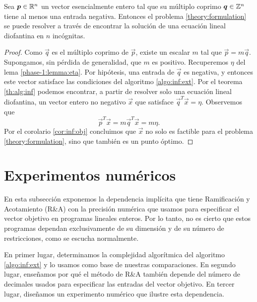 \begin{theorem}
	\label{infinite:th:complexity}
	Sea $\boldsymbol{p} \in \mathbb{R}^n$ un vector esencialmente entero tal que su múltiplo coprimo $\boldsymbol{q} \in
	\mathbb{Z}^n$ tiene al menos una entrada negativa. Entonces el problema \eqref{theory:formulation} se
	puede resolver a través de encontrar la solución de una ecuación lineal diofantina en $n$
	incógnitas.
\end{theorem}
\begin{proof}
	Como $\vec{q}$ es el múltiplo coprimo de $\vec{p}$, existe un escalar $m$ tal que
	$\vec{p} = m\vec{q}$. Supongamos, sin pérdida de generalidad, que $m$ es positivo. Recuperemos
	$\eta$ del lema \ref{phase-1:lemma:eta}. Por hipótesis, una entrada de $\vec{q}$ es negativa, y
	entonces este vector satisface las condiciones del algoritmo \ref{algo:inf:ext}. Por el teorema
	\ref{th:alg:inf} podemos encontrar, a partir de resolver solo una ecuación lineal diofantina, un
	vector entero no negativo $\vec{x}$ que satisface $\vec{q}^T\vec{x} = \eta$. Observemos que
	\begin{equation*}
		\vec{p}^T\vec{x} = m\vec{q}^T\vec{x} = m\eta.
	\end{equation*}
	Por el corolario \ref{cor:inf:obj} concluimos que $\vec{x}$ no solo es factible para el problema
	\eqref{theory:formulation}, sino que también es un punto óptimo.
\end{proof}

\section{Experimentos numéricos}
\label{sec:inf:exp}
\noindent
En esta subsección exponemos la dependencia implícita que tiene Ramificación y Acotamiento (R\&A)
con la precisión numérica que usamos para especificar el vector objetivo en programas lineales
enteros. Por lo tanto, no es cierto que estos programas dependan exclusivamente de su dimensión y de
su número de restricciones, como se escucha normalmente.

En primer lugar, determinamos la complejidad algorítmica del algoritmo \ref{algo:inf:ext} y lo
usamos como base de nuestras comparaciones. En segundo lugar, enseñamos por qué el método de R\&A
también depende del número de decimales usados para especificar las entradas del vector objetivo. En
tercer lugar, diseñamos un experimento numérico que ilustre esta dependencia.

